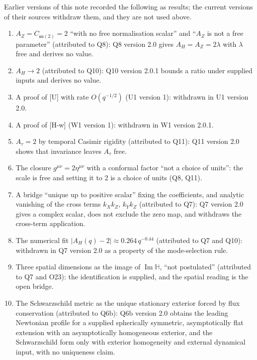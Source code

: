 \documentclass[11pt,a4paper]{article}
\theoremstyle{definition}
\newcommand{\su}{\mathfrak{su}}
\newcommand{\geff}{g^{\mu\nu}}
\newcommand{\Atau}{A_\tau}
\newcommand{\AH}{A_H}
\newcommand{\AZ}{A_Z}
\renewcommand{\Im}{\operatorname{Im}}
\begin{document}
      Earlier versions of this note recorded the following as results; the current versions of
      their sources withdraw them, and they are not used above.
      \begin{enumerate}
        \item $\AZ = C_{\su(2)} = 2$ ``with no free normalisation scalar'' and ``$\AZ$ is not a
        free parameter'' (attributed to Q8): Q8 version 2.0 gives $\AH = \AZ = 2\lambda$ with
        $\lambda$ free and derives no value.
        \item $\AH \to 2$ (attributed to Q10): Q10 version 2.0.1 bounds a ratio under supplied
        inputs and derives no value.
        \item A proof of [U] with rate $O(q^{-1/2})$ (U1 version 1): withdrawn in U1 version 2.0.
        \item A proof of [H-w] (W1 version 1): withdrawn in W1 version 2.0.1.
        \item $\Atau = 2$ by temporal Casimir rigidity (attributed to Q11): Q11 version 2.0 shows
        that invariance leaves $\Atau$ free.
        \item The closure $\geff = 2\eta^{\mu\nu}$ with a conformal factor ``not a choice of
        units'': the scale is free and setting it to 2 is a choice of units (Q8, Q11).
        \item A bridge ``unique up to positive scalar'' fixing the coefficients, and analytic
        vanishing of the cross terms $k_X k_Z$, $k_Y k_Z$ (attributed to Q7): Q7 version 2.0
        gives a complex scalar, does not exclude the zero map, and withdraws the cross-term
        application.
        \item The numerical fit $|A_H(q) - 2| \approx 0.264\,q^{-0.44}$ (attributed to Q7 and
        Q10): withdrawn in Q7 version 2.0 as a property of the mode-selection rule.
        \item Three spatial dimensions as the image of $\Im\mathbb{H}$, ``not postulated''
        (attributed to Q7 and O23): the identification is supplied, and the spatial reading is the
        open bridge.
        \item The Schwarzschild metric as the unique stationary exterior forced by flux conservation
        (attributed to Q6b): Q6b version 2.0 obtains the leading Newtonian profile for a supplied spherically
        symmetric, asymptotically flat extension with an asymptotically homogeneous exterior, and the
        Schwarzschild form only with exterior homogeneity and external dynamical input, with no uniqueness
        claim.

\end{enumerate}
\end{document}
